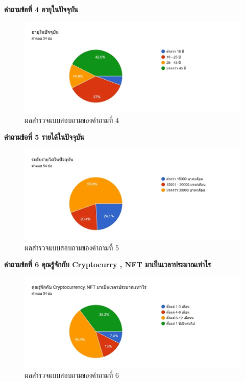 \documentclass[12pt,oneside,openright,a4paper]{cpe-thai-project}
\begin{document}
\bf คำถามข้อที่ 4 อายุในปัจจุบัน\\
\begin{figure}[!thb]
			\centering
			\includegraphics[scale=0.3]{apprex4}
			\caption{ผลสำรวจแบบสอบถามของคำถามที่ 4}
		\end{figure}
\FloatBarrier

\clearpage
\bf คำถามข้อที่ 5 รายได้ในปัจจุบัน\\
\begin{figure}[!thb]
			\centering
			\includegraphics[scale=0.3]{apprex5}
			\caption{ผลสำรวจแบบสอบถามของคำถามที่ 5}
		\end{figure}
\FloatBarrier

\bf คำถามข้อที่ 6  คุณรู้จักกับ Cryptocurry , NFT มาเป็นเวลาประมาณเท่าไร\\
\begin{figure}[!thb]
			\centering
			\includegraphics[scale=0.3]{apprex6}
			\caption{ผลสำรวจแบบสอบถามของคำถามที่ 6}
		\end{figure}
\FloatBarrier
\end{document}
